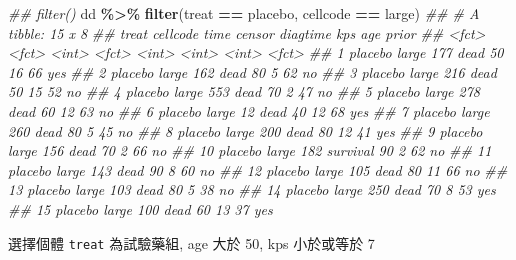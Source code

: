 \documentclass[
]{book}
\newenvironment{Shaded}{\begin{snugshade}}{\end{snugshade}}
\newcommand{\CommentTok}[1]{\textcolor[rgb]{0.56,0.35,0.01}{\textit{#1}}}
\newcommand{\KeywordTok}[1]{\textcolor[rgb]{0.13,0.29,0.53}{\textbf{#1}}}
\newcommand{\NormalTok}[1]{#1}
\newcommand{\OperatorTok}[1]{\textcolor[rgb]{0.81,0.36,0.00}{\textbf{#1}}}
\newcommand{\StringTok}[1]{\textcolor[rgb]{0.31,0.60,0.02}{#1}}
\begin{document}
\begin{Shaded}
\begin{Highlighting}[]
\CommentTok{\#\# filter()}
\NormalTok{dd }\OperatorTok{\%\textgreater{}\%}\StringTok{ }
\StringTok{  }\KeywordTok{filter}\NormalTok{(treat }\OperatorTok{==}\StringTok{ \textquotesingle{}placebo\textquotesingle{}}\NormalTok{, cellcode }\OperatorTok{==}\StringTok{ \textquotesingle{}large\textquotesingle{}}\NormalTok{)}
\CommentTok{\#\# \# A tibble: 15 x 8}
\CommentTok{\#\#    treat   cellcode  time censor   diagtime   kps   age prior}
\CommentTok{\#\#    \textless{}fct\textgreater{}   \textless{}fct\textgreater{}    \textless{}int\textgreater{} \textless{}fct\textgreater{}       \textless{}int\textgreater{} \textless{}int\textgreater{} \textless{}int\textgreater{} \textless{}fct\textgreater{}}
\CommentTok{\#\#  1 placebo large      177 dead           50    16    66 yes  }
\CommentTok{\#\#  2 placebo large      162 dead           80     5    62 no   }
\CommentTok{\#\#  3 placebo large      216 dead           50    15    52 no   }
\CommentTok{\#\#  4 placebo large      553 dead           70     2    47 no   }
\CommentTok{\#\#  5 placebo large      278 dead           60    12    63 no   }
\CommentTok{\#\#  6 placebo large       12 dead           40    12    68 yes  }
\CommentTok{\#\#  7 placebo large      260 dead           80     5    45 no   }
\CommentTok{\#\#  8 placebo large      200 dead           80    12    41 yes  }
\CommentTok{\#\#  9 placebo large      156 dead           70     2    66 no   }
\CommentTok{\#\# 10 placebo large      182 survival       90     2    62 no   }
\CommentTok{\#\# 11 placebo large      143 dead           90     8    60 no   }
\CommentTok{\#\# 12 placebo large      105 dead           80    11    66 no   }
\CommentTok{\#\# 13 placebo large      103 dead           80     5    38 no   }
\CommentTok{\#\# 14 placebo large      250 dead           70     8    53 yes  }
\CommentTok{\#\# 15 placebo large      100 dead           60    13    37 yes}
\end{Highlighting}
\end{Shaded}

選擇個體 \texttt{treat} 為試驗藥組, age 大於 50, kps 小於或等於 7
\end{document}
